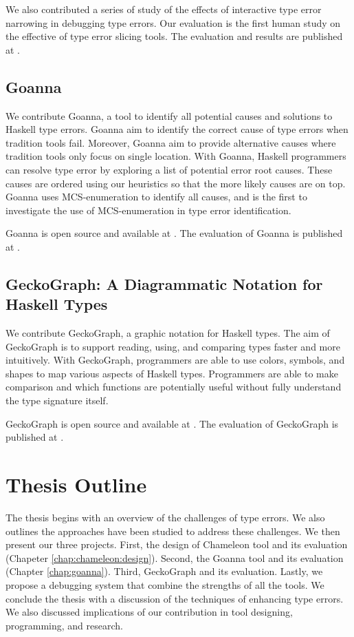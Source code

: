 We also contributed a series of study of the effects of interactive type error narrowing in debugging type errors.  Our evaluation is the first human study on the effective of type error slicing tools. The evaluation and results are published at \cite{fu_chameleonide_2023}.
  
\subsection{Goanna}
We contribute Goanna, a tool to identify all potential causes and solutions to Haskell type errors. Goanna aim to identify the correct cause of type errors when tradition tools fail. Moreover, Goanna aim to provide alternative causes where tradition tools only focus on single location. With Goanna, Haskell programmers can resolve type error by exploring a list of potential error root causes. These causes are ordered using our heuristics so that the more likely causes are on top. Goanna uses MCS-enumeration to identify all causes, and is the first to investigate the use of MCS-enumeration in type error identification.


 Goanna is open source and available at \cite{}. The evaluation of Goanna is published at \cite{}.

\subsection{GeckoGraph: A Diagrammatic Notation for Haskell Types}
We contribute GeckoGraph, a graphic notation for Haskell types. The aim of GeckoGraph is to support reading, using, and comparing types faster and more intuitively. With GeckoGraph, programmers are able to use colors, symbols, and shapes to map various aspects of Haskell types. Programmers are able to make comparison and which functions are potentially useful without fully understand the type signature itself. 


  GeckoGraph is open source and available at \cite{}. The evaluation of GeckoGraph is published at \cite{}.

\section{Thesis Outline}

The thesis begins with an overview of the challenges of type errors. We also outlines the approaches have been studied to address these challenges. We then present our three projects. First, the design of Chameleon tool and its evaluation (Chapeter \ref{chap:chameleon:design}). Second, the Goanna tool and its evaluation (Chapter \ref{chap:goanna}). Third, GeckoGraph and its evaluation. Lastly, we propose a debugging system that combine the strengths of all the tools. We conclude the thesis with a discussion of the techniques of enhancing type errors. We also discussed implications of our contribution in tool designing, programming, and research. 
